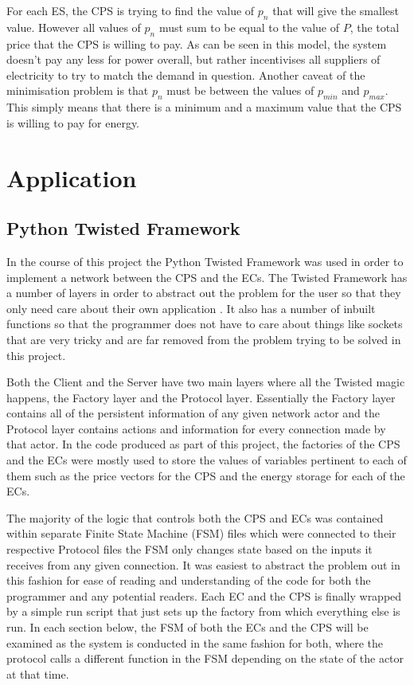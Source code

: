 \documentclass[a4paper, notitlepage]{report}
\begin{document}
For each ES, the CPS is trying to find the value of \(p_n\) that will give the
smallest value. However all values of \(p_n\) must sum to be equal to the value of
\(P\), the total price that the CPS is willing to pay. As can be seen in this
model, the system doesn't pay any less for power overall, but rather
incentivises all suppliers of electricity to try to match the demand in
question. Another caveat of the minimisation problem is that \(p_n\) must be
between the values of \(p_{min}\) and \(p_{max}\). This simply means that there is a
minimum and a maximum value that the CPS is willing to pay for energy.
\chapter{Application}
\label{sec:org6dc4a76}
\section{Python Twisted Framework}
\label{sec:orga608be2}
In the course of this project the Python Twisted Framework \cite{twistedpython}
was used in order to implement a network between the CPS and the ECs. The
Twisted Framework has a number of layers in order to abstract out the problem
for the user so that they only need care about their own application
\cite{kinder2005event}. It also has a number of inbuilt functions so that the
programmer does not have to care about things like sockets that are very tricky
and are far removed from the problem trying to be solved in this project.

Both the Client and the Server have two main layers where all the Twisted magic
happens, the Factory layer and the Protocol layer. Essentially the Factory layer
contains all of the persistent information of any given network actor and the
Protocol layer contains actions and information for every connection made by
that actor. In the code produced as part of this project, the factories of the
CPS and the ECs were mostly used to store the values of variables pertinent to
each of them such as the price vectors for the CPS and the energy storage for
each of the ECs.

The majority of the logic that controls both the CPS and ECs was contained
within separate Finite State Machine (FSM) files which were connected to their
respective Protocol files the FSM only changes state based on the inputs it
receives from any given connection. It was easiest to abstract the problem out
in this fashion for ease of reading and understanding of the code for both the
programmer and any potential readers. Each EC and the CPS is finally wrapped by
a simple run script that just sets up the factory from which everything else is
run. In each section below, the FSM of both the ECs and the CPS will be examined
as the system is conducted in the same fashion for both, where the protocol
calls a different function in the FSM depending on the state of the actor at
that time.
\end{document}
